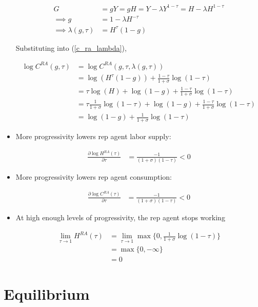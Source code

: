 \documentclass{article}
\begin{document}
\begin{itemize}
\begin{align*}
G &= gY = gH = Y - \lambda Y^{1-\tau} = H - \lambda H^{1-\tau} \\
\implies
g &= 1 - \lambda H^{-\tau}\\
\implies
\lambda(g, \tau)  &= H^{\tau}(1 - g)
\end{align*}

Substituting into (\ref{c_ra_lambda}),

\begin{align*}
\log C^{RA}(g, \tau) 
&= 
\log C^{RA}(g, \tau, \lambda(g, \tau)) \\
&= \log (H^{\tau}(1 - g)) +  \frac{1-\tau}{1 + \sigma} \log ( 1 - \tau) \\
&=\tau \log (H) + \log (1 - g) +  \frac{1-\tau}{1 + \sigma} \log ( 1 - \tau) \\
&=\tau \frac{1}{1 + \sigma} \log (1 - \tau) + \log (1 - g) +  \frac{1-\tau}{1 + \sigma} \log ( 1 - \tau) \\
&= \log (1 - g) +  \frac{1}{1 + \sigma} \log ( 1 - \tau)
\end{align*}

\item More progressivity lowers rep agent labor supply:

\begin{align*}
\frac{\partial \log H^{RA}(\tau)}{\partial \tau} &= \frac{-1}{(1 + \sigma)(1 - \tau)} < 0
\end{align*}

\item More progressivity lowers rep agent consumption:

\begin{align*}
\frac{\partial \log C^{RA}(\tau)}{\partial \tau} &=  \frac{-1}{(1 + \sigma)( 1 - \tau)} < 0
\end{align*}

\item At high enough levels of progressivity, the rep agent stops working

\begin{align*}
\lim_{\tau \to 1} H^{RA} (\tau) 
&= \lim_{\tau \to 1} \max\{0, \frac{1}{1 + \sigma} \log ( 1 - \tau)\}\\
&= \max\{0, -\infty\}\\
&= 0
\end{align*}

\end{itemize}


\section{Equilibrium}
\end{document}
